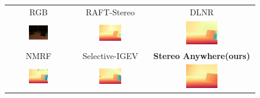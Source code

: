 \documentclass[10pt,twocolumn,letterpaper]{article}
\newcommand{\method}[0]{Stereo Anywhere\xspace}
\begin{document}
\begin{figure}[t]
\begin{tabular}{ccc}
        \small RGB &
        \small RAFT-Stereo \cite{lipson2021raft} &
        \small DLNR \cite{zhao2023high} \\
        \includegraphics[width=0.32\textwidth]{imgs/booster/rgb/32.jpg} &
        \includegraphics[width=0.32\textwidth]{imgs/booster/stereo/RAFT-Stereo/32.jpg} &
        \includegraphics[width=0.32\textwidth]{imgs/booster/stereo/DLNR/32.jpg} \\
        \small NMRF \cite{guan2024neural} &
        \small Selective-IGEV \cite{wang2024selective} &
        \textbf{\method (ours)} \\
        \includegraphics[width=0.32\textwidth]{imgs/booster/stereo/NMRF/32.jpg} &
        \includegraphics[width=0.32\textwidth]{imgs/booster/stereo/Selective/32.jpg} &
        \includegraphics[width=0.32\textwidth]{imgs/booster/stereo/Ours/32.jpg} \\


\end{tabular}
\end{figure}
\end{document}
